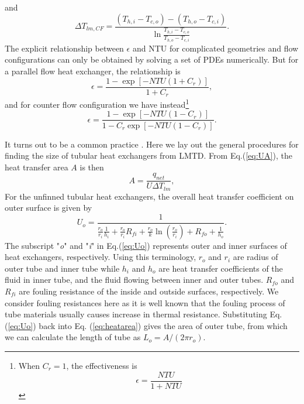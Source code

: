 and
\begin{equation}
	\Delta T_{l m, C F}=\frac{\left(T_{h, i}-T_{c, o}\right)-\left(T_{h, o}-T_{c, i}\right)}{\ln \frac{T_{h, i}-T_{c, o}}{T_{h, o}-T_{c, i}}}.
	\label{eq:Tlmcf}
\end{equation}
The explicit relationship between $ \epsilon $ and NTU for complicated geometries and flow configurations can only be obtained by solving a set of PDEs numerically. But for a parallel flow heat exchanger, the relationship is
\begin{equation}
	\epsilon=\frac{1-\exp \left[-N T U\left(1+C_{r}\right)\right]}{1+C_{r}},
	\label{eq:eps-parallel}
\end{equation}
and for counter flow configuration we have instead\footnote{When $ C_r=1 $, the effectiveness is\begin{equation}
		\epsilon = \frac{NTU}{1+NTU}
\end{equation}}
\begin{equation}
	\epsilon=\frac{1-\exp \left[-N T U\left(1-C_{r}\right)\right]}{1-C_{r} \exp \left[-N T U\left(1-C_{r}\right)\right]}.
	\label{eq:eps-counter}
\end{equation}

It turns out to be a common practice \cite{ezgi2017basic}. Here we lay out the general procedures for finding the size of tubular heat exchangers from LMTD. From Eq.(\ref{eq:UA}), the heat transfer area $ A $ is then
\begin{equation}
	A = \frac{q_{net}}{U\Delta T_{lm}},
	\label{eq:heatarea}
\end{equation}
For the unfinned tubular heat exchangers, the overall heat transfer coefficient on outer surface is given by
\begin{equation}
	U_o=\frac{1}{\frac{r_{o}}{r_{i}} \frac{1}{h_{i}}+\frac{r_{o}}{r_{i}} R_{f i}+\frac{r_{o}}{k} \ln \left(\frac{r_{o}}{r_{i}}\right)+R_{f o}+\frac{1}{h_{o}}}.
	\label{eq:Uo}
\end{equation}
The subscript "\textit{o}" and "\textit{i}" in Eq.(\ref{eq:Uo}) represents outer and inner surfaces of heat exchangers, respectively. Using this terminology, $ r_o $ and $ r_i $ are radius of outer tube and inner tube while $ h_i $ and $ h_o $ are heat transfer coefficients of the fluid in inner tube, and the fluid flowing between inner and outer tubes. $ R_{fo} $ and $ R_{fi} $ are fouling resistance of the inside and outside surfaces, respectively. We consider fouling resistances here as it is well known that the fouling process of tube materials usually causes increase in thermal resistance. Substituting Eq.(\ref{eq:Uo}) back into Eq. (\ref{eq:heatarea}) gives the area of outer tube, from which we can calculate the length of tube as $ L_o=A/(2\pi r_o) $.

